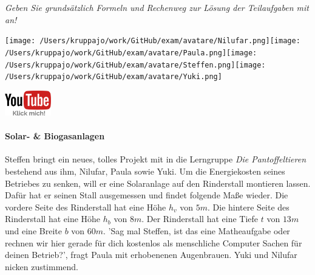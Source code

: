 \documentclass[a4paper, 9pt]{scrartcl}\usepackage[]{graphicx}\usepackage[]{xcolor}
\begin{document}
\textit{Geben Sie grundsätzlich Formeln und Rechenweg zur Lösung der Teilaufgaben mit an!} \\[1Ex]
 

 
\ifcollection
\begin{flushright}
\tiny\vspace{-3Ex}
\textbf{\examinhaltstart}
\exammodulemathstat
\vspace{-4Ex}
\end{flushright}
\begin{minipage}[t]{0.5\textwidth}
\texttt{[image: /Users/kruppajo/work/GitHub/exam/avatare/Nilufar.png]}\hspace{-4mm}\texttt{[image: /Users/kruppajo/work/GitHub/exam/avatare/Paula.png]}\hspace{-4mm}\texttt{[image: /Users/kruppajo/work/GitHub/exam/avatare/Steffen.png]}\hspace{-4mm}\texttt{[image: /Users/kruppajo/work/GitHub/exam/avatare/Yuki.png]}
\end{minipage}
\begin{minipage}[t]{0.5\textwidth}
\hfill
\href{https://youtu.be/aBxLkdF-c4M}{\includegraphics[width = 2cm]{img/youtube}}
\end{minipage}
\fi




\ifcollection
\paragraph{Solar- \& Biogasanlagen}
\fi



Steffen bringt ein neues, tolles Projekt mit in die Lerngruppe \textit{Die Pantoffeltieren} bestehend aus ihm, Nilufar, Paula sowie Yuki. Um die Energiekosten seines Betriebes zu senken, will er eine Solaranlage auf den Rinderstall montieren lassen. Dafür hat er seinen Stall ausgemessen und findet folgende Maße wieder. Die vordere Seite des Rinderstall hat eine Höhe $h_v$ von $5m$. Die hintere Seite des Rinderstall hat eine Höhe $h_b$ von $8m$. Der Rinderstall hat eine Tiefe $t$ von $13m$ und eine Breite $b$ von $60m$. 'Sag mal Steffen, ist das eine Matheaufgabe oder rechnen wir hier gerade für dich kostenlos als menschliche Computer Sachen für deinen Betrieb?', fragt Paula mit erhobenenen Augenbrauen. Yuki und Nilufar nicken zustimmend.
\end{document}
